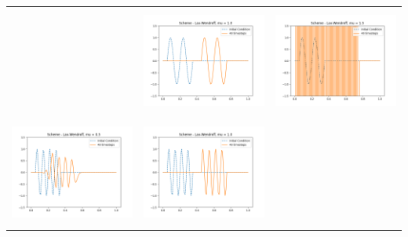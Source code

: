 \documentclass[a4paper,twoside,11pt]{article}
\begin{document}
\begin{table}[!h]
\begin{tabular}{ | c | m{5cm} | m{5cm} | }
\begin{minipage}{.3\textwidth}
            \end{minipage}
            &
            \begin{minipage}{.3\textwidth}
              \includegraphics[width=\linewidth, height=3.5cm]{../plots/scheme4-IC2-mu1_0.png}
            \end{minipage}
            &
            \begin{minipage}{.3\textwidth}
              \includegraphics[width=\linewidth, height=3.5cm]{../plots/scheme4-IC2-mu1_5.png}
            \end{minipage} \\
            \begin{minipage}{.3\textwidth}
              \includegraphics[width=\linewidth, height=3.5cm]{../plots/scheme4-IC3-mu0_5.png}
            \end{minipage}
            &
            \begin{minipage}{.3\textwidth}
              \includegraphics[width=\linewidth, height=3.5cm]{../plots/scheme4-IC3-mu1_0.png}
            \end{minipage}

\end{tabular}
\end{table}
\end{document}
